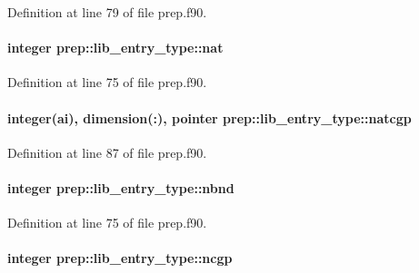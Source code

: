 Definition at line 79 of file prep.\-f90.

\hypertarget{structprep_1_1lib__entry__type_ac64d03a0a3f24ed137c23e7cfd4ee23e}{
\paragraph[{nat}]{\setlength{\rightskip}{0pt plus 5cm}integer prep\-::lib\-\_\-entry\-\_\-type\-::nat}}\label{structprep_1_1lib__entry__type_ac64d03a0a3f24ed137c23e7cfd4ee23e}


Definition at line 75 of file prep.\-f90.

\hypertarget{structprep_1_1lib__entry__type_ade6d0dcfac0155244fa2178ad86265ec}{
\paragraph[{natcgp}]{\setlength{\rightskip}{0pt plus 5cm}integer(ai), dimension(\-:), pointer prep\-::lib\-\_\-entry\-\_\-type\-::natcgp}}\label{structprep_1_1lib__entry__type_ade6d0dcfac0155244fa2178ad86265ec}


Definition at line 87 of file prep.\-f90.

\hypertarget{structprep_1_1lib__entry__type_af60ed05d0b1a8f55b13034182d7aac7f}{
\paragraph[{nbnd}]{\setlength{\rightskip}{0pt plus 5cm}integer prep\-::lib\-\_\-entry\-\_\-type\-::nbnd}}\label{structprep_1_1lib__entry__type_af60ed05d0b1a8f55b13034182d7aac7f}


Definition at line 75 of file prep.\-f90.

\hypertarget{structprep_1_1lib__entry__type_a9c9cf07995ef8642422f0913795b5d36}{
\paragraph[{ncgp}]{\setlength{\rightskip}{0pt plus 5cm}integer prep\-::lib\-\_\-entry\-\_\-type\-::ncgp}}\label{structprep_1_1lib__entry__type_a9c9cf07995ef8642422f0913795b5d36}



